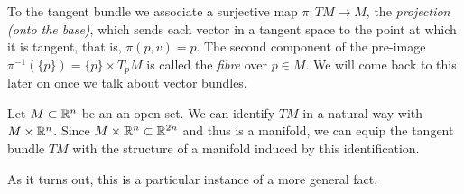 To the tangent bundle we associate a surjective map $\pi:TM \to M$, the \emph{projection (onto the base)}, which sends each vector in a tangent space to the point at which it is tangent, that is, $\pi(p,v) = p$.
The second component of the pre-image $\pi^{-1}(\{p\}) = \{p\}\times T_pM$ is called the \emph{fibre} over $p\in M$.
We will come back to this later on once we talk about vector bundles.

\begin{example}
  Let $M\subset \mathbb{R}^n$ be an an open set.
  We can identify $TM$ in a natural way with $M\times\mathbb{R}^n$.
  Since $M\times\mathbb{R}^n \subset \mathbb{R}^{2n}$ and thus is a manifold, we can equip the tangent bundle $TM$ with the structure of a manifold induced by this identification.
\end{example}

As it turns out, this is a particular instance of a more general fact.


